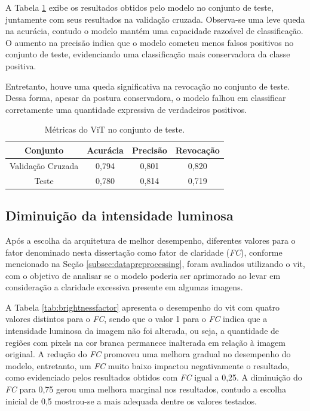 A Tabela \ref{tab:test} exibe os resultados obtidos pelo modelo no conjunto de teste, juntamente com seus resultados na validação cruzada.
Observa-se uma leve queda na acurácia, contudo o modelo mantém uma capacidade razoável de classificação.
O aumento na precisão indica que o modelo cometeu menos falsos positivos no conjunto de teste, evidenciando uma classificação mais conservadora da classe positiva.

Entretanto, houve uma queda significativa na revocação no conjunto de teste.
Dessa forma, apesar da postura conservadora, o modelo falhou em classificar corretamente uma quantidade expressiva de verdadeiros positivos.

\begin{table}[tb]
\caption{\label{tab:test} Métricas do ViT no conjunto de teste.}
\begin{center}
\begin{tabular}{c|ccc}
\toprule
Conjunto          & Acurácia & Precisão & Revocação \\
\midrule
Validação Cruzada & 0,794    & 0,801    & 0,820     \\
\midrule
Teste             & 0,780    & 0,814    & 0,719     \\
\bottomrule
\end{tabular}%
\end{center}
\end{table}

\subsection{Diminuição da intensidade luminosa}
Após a escolha da arquitetura de melhor desempenho, diferentes valores para o fator denominado nesta dissertação como fator de claridade (\textit{FC}), conforme mencionado na Seção \ref{subsec:datapreprocessing}, foram avaliados utilizando o \acrshort{vit}, com o objetivo de analisar se o modelo poderia ser aprimorado ao levar em consideração a claridade excessiva presente em algumas imagens.

A Tabela \ref{tab:brightnessfactor} apresenta o desempenho do \acrshort{vit} com quatro valores distintos para o \textit{FC}, sendo que o valor 1 para o \textit{FC} indica que a intensidade luminosa da imagem não foi alterada, ou seja, a quantidade de regiões com pixels na cor branca permanece inalterada em relação à imagem original.
A redução do \textit{FC} promoveu uma melhora gradual no desempenho do modelo, entretanto, um \textit{FC} muito baixo impactou negativamente o resultado, como evidenciado pelos resultados obtidos com \textit{FC} igual a 0,25.
A diminuição do \textit{FC} para 0,75 gerou uma melhora marginal nos resultados, contudo a escolha inicial de 0,5 mostrou-se a mais adequada dentre os valores testados.


